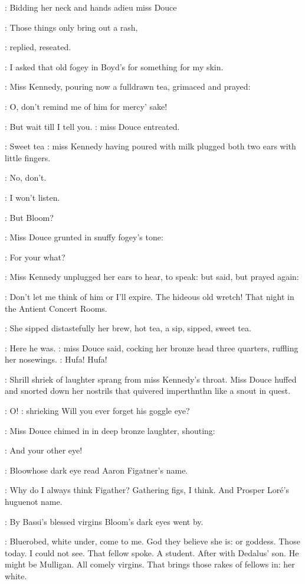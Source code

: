 :
Bidding her neck and hands adieu miss Douce

\MissD:
Those things only bring out a rash,

:
replied, reseated.

\MissD:
I asked that
old fogey in Boyd's for something for my skin.

:
Miss Kennedy, pouring now a fulldrawn tea, grimaced and prayed:

\MissK:
O, don't remind me of him for mercy' sake!

\MissD:
But wait till I tell you.
:
miss Douce entreated.

\MissK:
Sweet tea
:
miss Kennedy having poured with milk plugged both two
ears
with little fingers.

\MissK:
No, don't.

\MissK:
I won't listen.

:
But Bloom?

:
Miss Douce grunted in snuffy fogey's tone:

\MissD:
For your what?

:
Miss Kennedy unplugged her ears to hear, to speak: but said, but
prayed again:

\MissK:
Don't let me think of him or I'll expire. The hideous old wretch! That
night in the Antient Concert Rooms.

:
She sipped distastefully her brew, hot tea,
a sip, sipped,
sweet tea.

\MissD:
Here he was.
:
miss Douce said, cocking her bronze head three quarters,
ruffling her nosewings.
\MissD:
Hufa! Hufa!

:
Shrill shriek of laughter sprang from miss Kennedy's throat. Miss
Douce huffed and snorted down her nostrils that quivered imperthnthn like
a snout in quest.

\MissK:
O! \Stage:
shrieking
Will you ever forget his goggle eye?

:
Miss Douce chimed in in deep bronze laughter, shouting:

\MissD:
And your other eye!

:
Bloowhose dark eye read Aaron Figatner's name.

\BloomInt:
Why do I always
think Figather? Gathering figs, I think.
And Prosper Loré's huguenot
name.

:
By Bassi's blessed virgins Bloom's dark eyes went by.

\BloomInt:
Bluerobed, white
under, come to me. God they believe she is: or goddess. Those today. I
could not see. That fellow spoke. A student. After with Dedalus' son. He
might be Mulligan. All comely virgins. That brings those rakes of fellows
in: her white.

